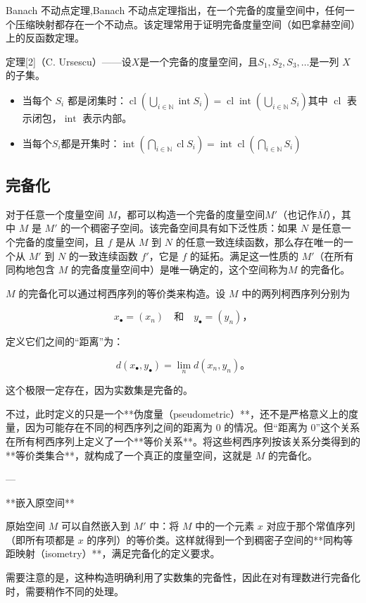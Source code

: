 Banach 不动点定理,Banach 不动点定理指出，在一个完备的度量空间中，任何一个压缩映射都存在一个不动点。该定理常用于证明完备度量空间（如巴拿赫空间）上的反函数定理。

定理[2]（C. Ursescu）——设$X$是一个完备的度量空间，且$S_1, S_2, S_3, \ldots$是一列 $X$ 的子集。
\begin{itemize}
\item 当每个 $S_i$ 都是闭集时：$\operatorname{cl} \left(\bigcup_{i\in\mathbb{N}} \operatorname{int} S_i\right) = \operatorname{cl}\operatorname{int} \left(\bigcup_{i\in\mathbb{N}} S_i\right)$其中 $\operatorname{cl}$ 表示闭包，$\operatorname{int}$ 表示内部。
\item 当每个$S_i$都是开集时：$\operatorname{int} \left(\bigcap_{i\in\mathbb{N}} \operatorname{cl} S_i\right)=\operatorname{int} \operatorname{cl} \left(\bigcap_{i\in\mathbb{N}} S_i\right)$
\end{itemize}
\subsection{完备化}
对于任意一个度量空间 $M$，都可以构造一个完备的度量空间$M'$（也记作$\overline{M}$），其中 $M$ 是 $M'$ 的一个稠密子空间。该完备空间具有如下泛性质：如果 $N$ 是任意一个完备的度量空间，且 $f$ 是从 $M$ 到 $N$ 的任意一致连续函数，那么存在唯一的一个从 $M'$ 到 $N$ 的一致连续函数 $f'$，它是 $f$ 的延拓。满足这一性质的 $M'$（在所有同构地包含 $M$ 的完备度量空间中）是唯一确定的，这个空间称为$M$ 的完备化。

$M$ 的完备化可以通过柯西序列的等价类来构造。设 $M$ 中的两列柯西序列分别为

$$
x_{\bullet} = (x_n) \quad \text{和} \quad y_{\bullet} = (y_n)，
$$

定义它们之间的“距离”为：

$$
d(x_{\bullet}, y_{\bullet}) = \lim_{n} d(x_n, y_n)。
$$

这个极限一定存在，因为实数集是完备的。

不过，此时定义的只是一个**伪度量（pseudometric）**，还不是严格意义上的度量，因为可能存在不同的柯西序列之间的距离为 0 的情况。但“距离为 0”这个关系在所有柯西序列上定义了一个**等价关系**。将这些柯西序列按该关系分类得到的**等价类集合**，就构成了一个真正的度量空间，这就是 $M$ 的完备化。

---

**嵌入原空间**

原始空间 $M$ 可以自然嵌入到 $M'$ 中：将 $M$ 中的一个元素 $x$ 对应于那个常值序列（即所有项都是 $x$ 的序列）的等价类。这样就得到一个到稠密子空间的**同构等距映射（isometry）**，满足完备化的定义要求。

需要注意的是，这种构造明确利用了实数集的完备性，因此在对有理数进行完备化时，需要稍作不同的处理。
